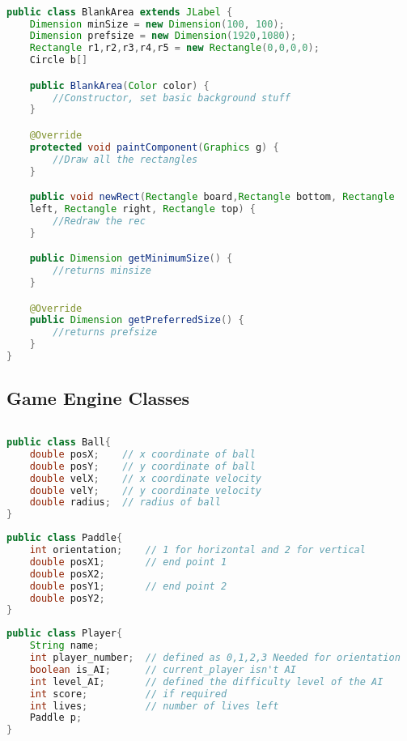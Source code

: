 \documentclass{article}
\begin{document}
\begin{lstlisting}[language=Java, caption={Class Parameters for Blank Area}]

public class BlankArea extends JLabel {
    Dimension minSize = new Dimension(100, 100);
    Dimension prefsize = new Dimension(1920,1080);
    Rectangle r1,r2,r3,r4,r5 = new Rectangle(0,0,0,0);
    Circle b[]

    public BlankArea(Color color) {
        //Constructor, set basic background stuff
    }

    @Override
    protected void paintComponent(Graphics g) {
        //Draw all the rectangles
    }

    public void newRect(Rectangle board,Rectangle bottom, Rectangle 
    left, Rectangle right, Rectangle top) {
        //Redraw the rec
    }

    public Dimension getMinimumSize() {
		//returns minsize
    }

    @Override
    public Dimension getPreferredSize() {
		//returns prefsize
	}
}
\end{lstlisting}

\subsection{Game Engine Classes}

\begin{lstlisting}[language=Java, caption={Class Parameters for Ball}]
 
public class Ball{
	double posX;	// x coordinate of ball
	double posY;	// y coordinate of ball
	double velX;	// x coordinate velocity
	double velY;	// y coordinate velocity
	double radius;	// radius of ball
}
\end{lstlisting}

\begin{lstlisting}[language=Java, caption={Class Parameters for Paddle}]
public class Paddle{
	int orientation;	// 1 for horizontal and 2 for vertical
	double posX1;		// end point 1
	double posX2;
	double posY1;		// end point 2
	double posY2;
}
\end{lstlisting}

\begin{lstlisting}[language=Java, caption={Class Parameters for Player}]
public class Player{
	String name;
	int player_number;	// defined as 0,1,2,3 Needed for orientation
	boolean is_AI;		// current_player isn't AI
	int level_AI;		// defined the difficulty level of the AI
	int score; 			// if required
	int lives; 			// number of lives left
	Paddle p;
}

\end{lstlisting}
\end{document}
